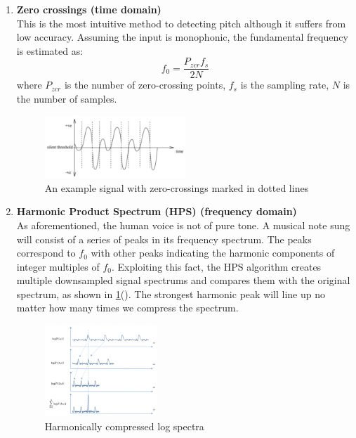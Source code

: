 \begin{enumerate}
    \item \textbf{Zero crossings (time domain)}\\
    This is the most intuitive method to detecting pitch although it suffers from low accuracy.
    Assuming the input is monophonic, the fundamental frequency is estimated as:
    \[f_0 = \frac{P_{zcr}f_s}{2N}\]
    where $P_{zcr}$ is the number of zero-crossing points, $f_s$ is the sampling rate,
    $N$ is the number of samples.
    \begin{figure}[h]
        \centering
        \includegraphics[width=0.5\textwidth]{Figures/zcr.png}
        \caption[An example signal with zero-crossings marked in dotted lines]{An example signal with zero-crossings marked in dotted lines}
    \end{figure}
    \item \textbf{Harmonic Product Spectrum (HPS) (frequency domain)}\\
    As aforementioned, the human voice is not of pure tone. A musical note sung will consist of a series of peaks in its frequency spectrum. The peaks correspond to $f_0$ with other peaks indicating the harmonic components of integer multiples of $f_0$. 
    Exploiting this fact, the HPS algorithm creates multiple downsampled signal spectrums and compares them with the original spectrum, as shown in 
    \cref{HPS}(\cite{ias}).
    The strongest harmonic peak will line up no matter how many times we compress the spectrum.
    
    \begin{figure}[h]
        \centering
        \includegraphics[width=0.4\textwidth]{Figures/HPS.png}
        \caption{Harmonically compressed log spectra}
        \label{HPS}
    \end{figure}
    

\end{enumerate}
